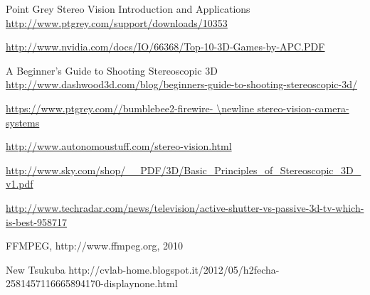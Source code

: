 
\begin{thebibliography}{99}




 Point Grey Stereo Vision Introduction and Applications \url{http://www.ptgrey.com/support/downloads/10353}


 \url{http://www.nvidia.com/docs/IO/66368/Top-10-3D-Games-by-APC.PDF}

 A Beginner's Guide to Shooting Stereoscopic 3D \\ \url{http://www.dashwood3d.com/blog/beginners-guide-to-shooting-stereoscopic-3d/}

 \url{https://www.ptgrey.com//bumblebee2-firewire- \newline stereo-vision-camera-systems}

\url{http://www.autonomoustuff.com/stereo-vision.html}

 \url{http://www.sky.com/shop/__PDF/3D/Basic_Principles_of_Stereoscopic_3D_v1.pdf}

 \url{http://www.techradar.com/news/television/active-shutter-vs-passive-3d-tv-which-is-best-958717}


 FFMPEG, http://www.ffmpeg.org, 2010

New Tsukuba http://cvlab-home.blogspot.it/2012/05/h2fecha-2581457116665894170-displaynone.html



\end{thebibliography}
\clearpage
\thispagestyle{empty}